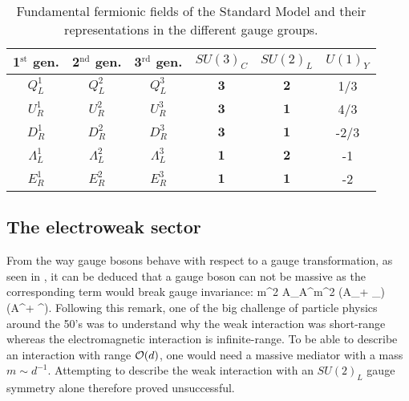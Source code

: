     \begin{table}
        \centering
        \begin{tabular}{|ccc||ccc|}
            \hline
            1$^\text{st}$ gen. & 2$^\text{nd}$ gen. & 3$^\text{rd}$ gen. & $SU(3)_C$    &  $SU(2)_L$    & $U(1)_Y$ \\
            \hline
            \hline
            $Q^1_L$            & $Q^2_L$            & $Q^3_L$            & $\mathbf{3}$ &  $\mathbf{2}$ &  1/3    \\
            $U^1_R$            & $U^2_R$            & $U^3_R$            & $\mathbf{3}$ &  $\mathbf{1}$ &  4/3    \\
            $D^1_R$            & $D^2_R$            & $D^3_R$            & $\mathbf{3}$ &  $\mathbf{1}$ & -2/3    \\
            \hline
            \hline
            $\Lambda^1_L$      & $\Lambda^2_L$      & $\Lambda^3_L$      & $\mathbf{1}$ &  $\mathbf{2}$ &  -1     \\
            $E^1_R$            & $E^2_R$            & $E^3_R$            & $\mathbf{1}$ &  $\mathbf{1}$ &  -2     \\
            \hline
        \end{tabular}
        \caption{Fundamental fermionic fields of the Standard Model and their representations
        in the different gauge groups.}
        \label{tab:StandardModelFields}
    \end{table}

    \subsection{The electroweak sector}

    From the way gauge bosons behave with respect to a gauge transformation, as seen in
    , it can be deduced that a gauge boson can not
    be massive as the corresponding term would break gauge invariance:
    {
        m^2 A_\mu A^\mu \neq m^2  (A_\mu +  \partial_\mu \theta)(A^\mu +  \partial^\mu \theta).
    }
    Following this remark, one of the big challenge of particle physics around the 50's
    was to understand why the weak interaction was short-range whereas the electromagnetic
    interaction is infinite-range. To be able to describe an interaction with range
    $\mathcal{O}(d)$, one would need a massive mediator with a mass $m \sim d^{-1}$. Attempting
    to describe the weak interaction with an $SU(2)_L$ gauge symmetry alone therefore proved
    unsuccessful.

